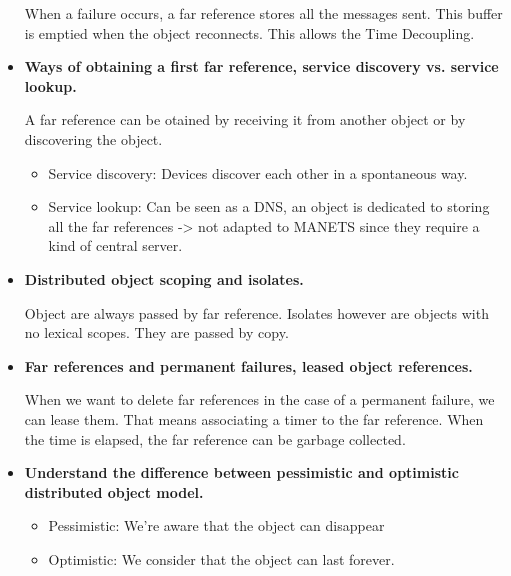 \documentclass[a4paper]{report}
\begin{document}
\begin{itemize}
  When a failure occurs, a far reference stores all the messages sent. This buffer is emptied when the object reconnects. This allows the Time Decoupling.
  \item \textbf{Ways of obtaining a first far reference, service discovery vs. service lookup.}

  A far reference can be otained by receiving it from another object or by discovering the object.
  \begin{itemize}
    \item Service discovery: Devices discover each other in a spontaneous way. 
    \item Service lookup: Can be seen as a DNS, an object is dedicated to storing all the far references  -> not adapted to MANETS since they require a kind of central server.
  \end{itemize}
  \item \textbf{Distributed object scoping and isolates.}

  Object are always passed by far reference. Isolates however are objects with no lexical scopes. They are passed by copy.
  \item \textbf{Far references and permanent failures, leased object references.}

  When we want to delete far references in the case of a permanent failure, we can lease them. That means associating a timer to the far reference. When the time is elapsed, the far reference can be garbage collected.
  \item \textbf{Understand the difference between pessimistic and optimistic distributed object model.}

  \begin{itemize}
    \item Pessimistic: We're aware that the object can disappear
    \item Optimistic: We consider that the object can last forever.
  \end{itemize}
\end{itemize}



\end{document}
